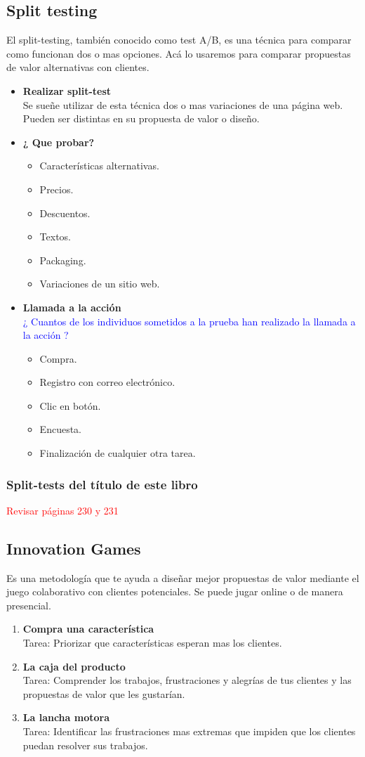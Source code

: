 \documentclass[11pt]{book}
\begin{document}
\subsection{Split testing}
El split-testing, también conocido como test A/B, es una técnica para comparar como funcionan dos o mas opciones.
Acá lo usaremos para comparar propuestas de valor alternativas con clientes.
\begin{itemize}
\item \textbf{ Realizar split-test }\\
Se sueñe utilizar de esta técnica dos o mas variaciones de una página web. Pueden ser distintas en su propuesta de valor o diseño.
\item \textbf{¿ Que probar? }\\
\begin{itemize}
\item Características alternativas.
\item Precios.
\item Descuentos.
\item Textos.
\item Packaging.
\item Variaciones de un sitio web.
\end{itemize}
\item \textbf{ Llamada a la acción }\\
\textcolor{blue}{¿ Cuantos de los individuos sometidos a la prueba han realizado la llamada a la acción ?}
\begin{itemize}
\item Compra.
\item Registro con correo electrónico.
\item Clic en botón.
\item Encuesta.
\item Finalización de cualquier otra tarea.
\end{itemize}
\end{itemize}
\subsubsection{Split-tests del título de este libro}
\textcolor{red}{Revisar páginas 230 y 231}
\subsection{Innovation Games}
Es una metodología que te ayuda a diseñar mejor propuestas de valor mediante el juego colaborativo con clientes potenciales. Se puede jugar online o de manera presencial.
\begin{enumerate}
\item \textbf{ Compra una característica }\\
Tarea: Priorizar que características esperan mas los clientes.
\item \textbf{ La caja del producto }\\
Tarea: Comprender los trabajos, frustraciones y alegrías de tus clientes y las propuestas de valor que les gustarían.
\item \textbf{ La lancha motora }\\
Tarea: Identificar las frustraciones mas extremas que impiden que los clientes puedan resolver sus trabajos.
\end{enumerate}
\end{document}
